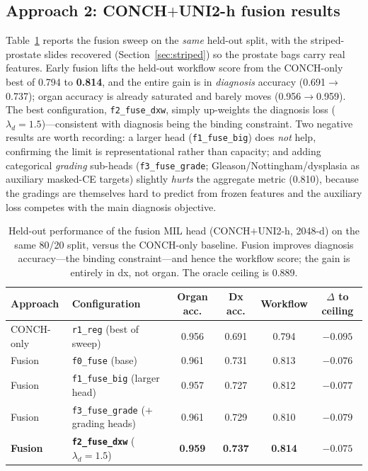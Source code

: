 \documentclass[11pt,a4paper]{article}
\newcommand{\code}[1]{\texttt{\small #1}}
\begin{document}
\subsection{Approach 2: CONCH$+$UNI2-h fusion results}
\label{sec:fusion-results}
Table~\ref{tab:fusion} reports the fusion sweep on the \emph{same} held-out split, with the
striped-prostate slides recovered (Section~\ref{sec:striped}) so the prostate bags carry real
features. Early fusion lifts the held-out workflow score from the CONCH-only best of 0.794 to
\textbf{0.814}, and the entire gain is in \emph{diagnosis} accuracy (0.691$\rightarrow$0.737);
organ accuracy is already saturated and barely moves (0.956$\rightarrow$0.959). The best
configuration, \code{f2\_fuse\_dxw}, simply up-weights the diagnosis loss
($\lambda_d{=}1.5$)---consistent with diagnosis being the binding constraint. Two negative results
are worth recording: a larger head (\code{f1\_fuse\_big}) does \emph{not} help, confirming the
limit is representational rather than capacity; and adding categorical \emph{grading} sub-heads
(\code{f3\_fuse\_grade}; Gleason/Nottingham/dysplasia as auxiliary masked-CE targets) slightly
\emph{hurts} the aggregate metric (0.810), because the gradings are themselves hard to predict
from frozen features and the auxiliary loss competes with the main diagnosis objective.

\begin{table}[h]
\centering
\caption{Held-out performance of the fusion MIL head (CONCH$+$UNI2-h, 2048-d) on the same 80/20
split, versus the CONCH-only baseline. Fusion improves diagnosis accuracy---the binding
constraint---and hence the workflow score; the gain is entirely in dx, not organ. The oracle
ceiling is 0.889.}
\label{tab:fusion}
\begin{tabular}{llcccc}
\toprule
Approach & Configuration & Organ acc. & Dx acc. & Workflow & $\Delta$ to ceiling \\
\midrule
CONCH-only & \code{r1\_reg} (best of sweep) & 0.956 & 0.691 & 0.794 & $-0.095$ \\
\midrule
Fusion & \code{f0\_fuse} (base) & 0.961 & 0.731 & 0.813 & $-0.076$ \\
Fusion & \code{f1\_fuse\_big} (larger head) & 0.957 & 0.727 & 0.812 & $-0.077$ \\
Fusion & \code{f3\_fuse\_grade} ($+$grading heads) & 0.961 & 0.729 & 0.810 & $-0.079$ \\
\textbf{Fusion} & \textbf{\code{f2\_fuse\_dxw}} ($\lambda_d{=}1.5$) & \textbf{0.959} & \textbf{0.737} & \textbf{0.814} & $\mathbf{-0.075}$ \\
\bottomrule
\end{tabular}
\end{table}
\end{document}
